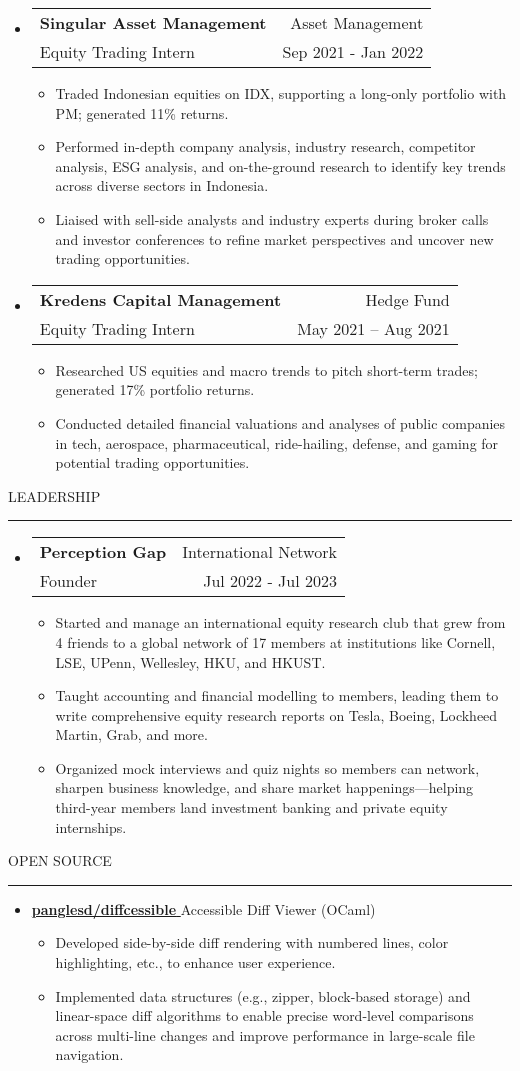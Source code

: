 \documentclass[letterpaper, 11pt]{article}
\makeatletter
\def\sectionlineskip{\medskip}
\def\sectionskip{\medskip}
\newcommand{\SectionHeading}[1]{
  \sectionskip
  \raggedright\raggedbottom\MakeUppercase{\large{#1}}
  \sectionlineskip
  \hrule
  \color{black}
}
\newcommand{\ResumeEntryTSDL}[4]{
  \vspace{1pt}\item
    \begin{tabular*}{\textwidth}[t]{l@{\extracolsep{\fill}}r} 
      \textbf{#1} & #2 \\
      #3 & #4 \\
    \end{tabular*}\vspace{-2.835pt} %
}
\newcommand{\ResumeItemDefault}[1]{
  \item{
    #1 \vspace{-2.835pt}
  }
}
\newcommand{\ResumeEntryStart}{\begin{itemize}[leftmargin=0mm, label={}]}
\newcommand{\ResumeEntryEnd}{\end{itemize}\vspace{-2.835pt}} %
\newcommand{\ResumeItemListStart}{\begin{itemize}[leftmargin=5mm, label=$\bullet$, itemsep=1mm, parsep=1mm]} %
\newcommand{\ResumeItemListEnd}{\end{itemize}}
\newcommand{\OpenSourceProjectItem}[3]{
  \item{
    \href{#1}{\textbf{#2} }\hfill{#3}\vspace{-2.835pt}
  }
}
\makeatother
\begin{document}
  \ResumeEntryStart
    \ResumeEntryTSDL{Singular Asset Management}{Asset Management}{Equity Trading Intern}{Sep 2021 - Jan 2022}
    \ResumeItemListStart
      \ResumeItemDefault{Traded Indonesian equities on IDX, supporting a long-only portfolio with PM; generated 11\% returns.}
      \ResumeItemDefault{Performed in-depth company analysis, industry research, competitor analysis, ESG analysis, and on-the-ground research to identify key trends across diverse sectors in Indonesia.}
      \ResumeItemDefault{Liaised with sell-side analysts and industry experts during broker calls and investor conferences to refine market perspectives and uncover new trading opportunities.}
    \ResumeItemListEnd
  \ResumeEntryEnd

  \ResumeEntryStart
  \ResumeEntryTSDL{Kredens Capital Management}{Hedge Fund}{Equity Trading Intern}{May 2021 – Aug 2021}
    \ResumeItemListStart
      \ResumeItemDefault{Researched US equities and macro trends to pitch short-term trades; generated 17\% portfolio returns.}
      \ResumeItemDefault{Conducted detailed financial valuations and analyses of public companies in tech, aerospace, pharmaceutical, ride-hailing, defense, and gaming for potential trading opportunities.}
    \ResumeItemListEnd
  \ResumeEntryEnd

  \SectionHeading{Leadership}
  \ResumeEntryStart
    \ResumeEntryTSDL{Perception Gap}{International Network}{Founder}{Jul 2022 - Jul 2023}
    \ResumeItemListStart
      \ResumeItemDefault{Started and manage an international equity research club that grew from 4 friends to a global network of 17 members at institutions like Cornell, LSE, UPenn, Wellesley, HKU, and HKUST.}
      \ResumeItemDefault{Taught accounting and financial modelling to members, leading them to write comprehensive equity research reports on Tesla, Boeing, Lockheed Martin, Grab, and more.}
      \ResumeItemDefault{Organized mock interviews and quiz nights so members can network, sharpen business knowledge, and share market happenings—helping third-year members land investment banking and private equity internships.}
    \ResumeItemListEnd
  \ResumeEntryEnd

  \SectionHeading{Open Source}
  \ResumeEntryStart
  \OpenSourceProjectItem{https://github.com/panglesd/diffcessible}{panglesd/diffcessible}{Accessible Diff Viewer (OCaml)}
  \ResumeItemListStart
    \ResumeItemDefault{Developed side-by-side diff rendering with numbered lines, color highlighting, etc., to enhance user experience.}
    \ResumeItemDefault{Implemented data structures (e.g., zipper, block-based storage) and linear-space diff algorithms to enable precise word-level comparisons across multi-line changes and improve performance in large-scale file navigation.}
  \ResumeItemListEnd
  \ResumeEntryEnd
\end{document}
